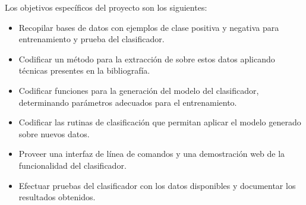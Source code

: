 %

Los objetivos específicos del proyecto son los siguientes:
%
\begin{itemize}
\item Recopilar bases de datos con ejemplos de clase positiva y
  negativa para entrenamiento y prueba del clasificador.
\item Codificar un método para la extracción de  sobre
  estos datos aplicando técnicas presentes en la bibliografía.
\item Codificar funciones para la generación del modelo del
  clasificador, determinando parámetros adecuados para el
  entrenamiento.
\item Codificar las rutinas de clasificación que permitan aplicar el
  modelo generado sobre nuevos datos.
\item Proveer una interfaz de línea de comandos y una demostración web
  de la funcionalidad del clasificador.
\item Efectuar pruebas del clasificador con los datos disponibles y
  documentar los resultados obtenidos.
\end{itemize}
%
